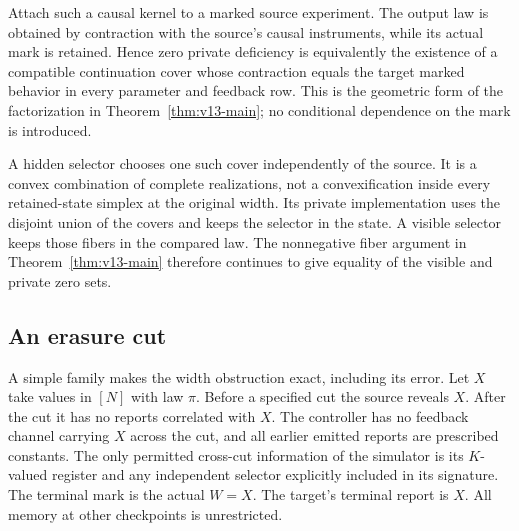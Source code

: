 Attach such a causal kernel to a marked source experiment. The output law
is obtained by contraction with the source's causal instruments, while its
actual mark is retained. Hence zero private deficiency is equivalently the
existence of a compatible continuation cover whose contraction equals the
target marked behavior in every parameter and feedback row. This is the
geometric form of the factorization in Theorem~\ref{thm:v13-main}; no
conditional dependence on the mark is introduced.

A hidden selector chooses one such cover independently of the source.
It is a convex combination of complete realizations, not a convexification
inside every retained-state simplex at the original width. Its private
implementation uses the disjoint union of the covers and keeps the selector
in the state. A visible selector keeps those fibers in the compared law.
The nonnegative fiber argument in Theorem~\ref{thm:v13-main} therefore
continues to give equality of the visible and private zero sets.

\subsection{An erasure cut}
A simple family makes the width obstruction exact, including its error.
Let $X$ take values in $[N]$ with law $\pi$. Before a specified cut the
source reveals $X$. After the cut it has no reports correlated with $X$.
The controller has no feedback channel carrying $X$ across the cut, and
all earlier emitted reports are prescribed constants. The only permitted
cross-cut information of the simulator is its $K$-valued register and any
independent selector explicitly included in its signature. The terminal
mark is the actual $W=X$. The target's terminal report is $X$.
All memory at other checkpoints is unrestricted.

